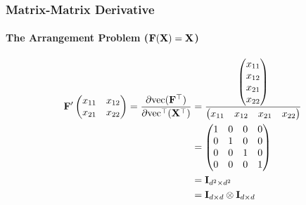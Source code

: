 \begin{frame}
\frametitle{Matrix-Matrix Derivative}
\framesubtitle{The Arrangement Problem ($\mathbf{F}(\mathbf{X}) = \mathbf{X}$)}
%
\footnotesize
\textcolor{blue}{
\begin{align*}
\mF'
\begin{pmatrix} 
  x_{11} & x_{12} \\
  x_{21} & x_{22} 
\end{pmatrix}
=
\frac{\partial \myvec(\mF^\top)}{\partial \myvec^\top(\mX^\top)}
&= 
\frac{\begin{pmatrix} x_{11} \\ x_{12} \\ x_{21} \\ x_{22} \end{pmatrix}}
{\begin{pmatrix} x_{11} & x_{12} & x_{21} & x_{22} \end{pmatrix}} \\
%
&= 
\begin{pmatrix} 
  1 & 0 & 0 & 0 \\
  0 & 1 & 0 & 0 \\
  0 & 0 & 1 & 0 \\
  0 & 0 & 0 & 1 \\
\end{pmatrix} \\
&= \mI_{d^2\times{}d^2} \\
&= \mI_{d\times{}d}\otimes{}\mI_{d\times{}d}
\end{align*}
} %
\normalsize
\end{frame}


